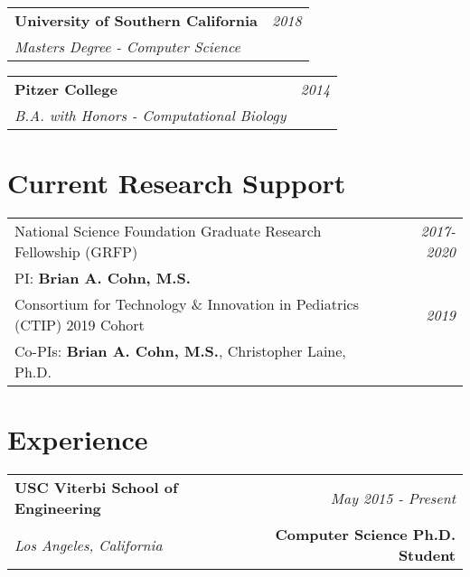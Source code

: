 \documentclass[10pt,a4paper]{article}
\begin{document}
  \vspace*{1mm}\noindent\begin{tabularx}{17cm}{X r}
    \textbf{University of Southern California} & \textit{2018} \\ %
    \textit{Masters Degree - Computer Science}
  \end{tabularx} 

  \vspace*{1mm}\noindent\begin{tabularx}{17cm}{X r}
    \textbf{Pitzer College} & \textit{2014} \\
    \textit{B.A. with Honors - Computational Biology}
  \end{tabularx}

  \vspace*{2mm}\section*{Current Research Support}

  \vspace*{1mm}\noindent\begin{tabularx}{17cm}{X r}
    National Science Foundation Graduate Research Fellowship (GRFP) & \textit{2017-2020} \\
    PI: \textbf{Brian A. Cohn, M.S.} \\

    Consortium for Technology \& Innovation in Pediatrics (CTIP) 2019 Cohort & \textit{2019} \\
    Co-PIs: \textbf{Brian A. Cohn, M.S.}, Christopher Laine, Ph.D. \\


\end{tabularx}



    \vspace*{6mm}\section*{Experience}
  \noindent\begin{tabularx}{17cm}{X r}
    \textbf{USC Viterbi School of Engineering} & \textit{May 2015 - Present} \\
    \textit{Los Angeles, California} & \textbf{Computer Science Ph.D. Student} \\
  \end{tabularx}
\end{document}
